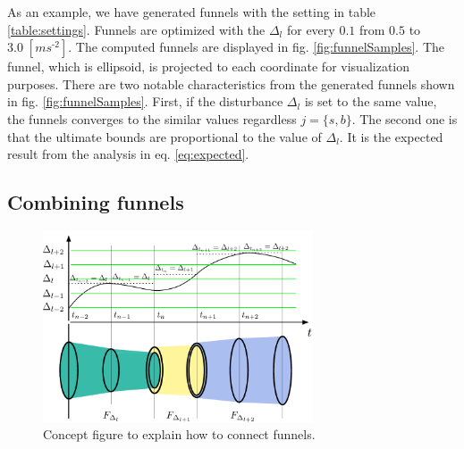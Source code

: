 \documentclass[letterpaper, 10 pt, conference]{ieeeconf}  %
\begin{document}
As an example, we have generated funnels with the setting in table \ref{table:settings}.
Funnels are optimized with the $\Delta_l$ for every $0.1$ from $0.5$ to $3.0\;[m s^\text{-2}]$. 
The computed funnels are displayed in fig. \ref{fig:funnelSamples}.
The funnel, which is ellipsoid, is projected to each coordinate for visualization purposes.
There are two notable characteristics from the generated funnels shown in fig. \ref{fig:funnelSamples}. 
First, if the disturbance $\Delta_l$ is set to the same value, the funnels converges to the similar values regardless $j=\{s,b\}$.
The second one is that the ultimate bounds are proportional to the value of $\Delta_l$. 
It is the expected result from the analysis in eq. \eqref{eq:expected}.

\subsection{Combining funnels}
\begin{figure}[t]
\centering
\includegraphics[width=8cm]{funnel_combine.pdf}
\caption{Concept figure to explain how to connect funnels.}
 \label{fig:combiningConcept}
\end{figure}
\end{document}
